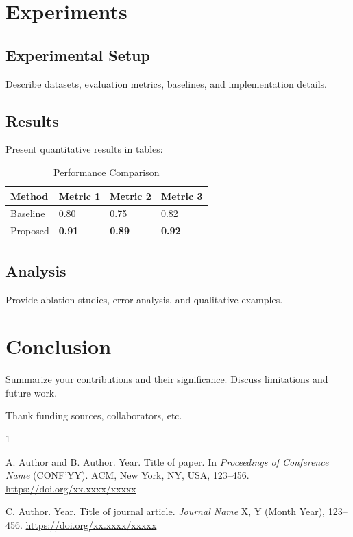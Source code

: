 \documentclass[sigconf]{acmart}
\begin{document}
\section{Experiments}
\label{sec:experiments}

\subsection{Experimental Setup}

Describe datasets, evaluation metrics, baselines, and implementation details.

\subsection{Results}

Present quantitative results in tables:

\begin{table}[htbp]
\caption{Performance Comparison}
\label{tab:results}
\centering
\begin{tabular}{@{}llll@{}}
\toprule
Method & Metric 1 & Metric 2 & Metric 3 \\
\midrule
Baseline & 0.80 & 0.75 & 0.82 \\
Proposed & \textbf{0.91} & \textbf{0.89} & \textbf{0.92} \\
\bottomrule
\end{tabular}
\end{table}

\subsection{Analysis}

Provide ablation studies, error analysis, and qualitative examples.

\section{Conclusion}
\label{sec:conclusion}

Summarize your contributions and their significance. Discuss limitations and 
future work.

\begin{acks}
Thank funding sources, collaborators, etc.
\end{acks}


% 

\begin{thebibliography}{1}

A. Author and B. Author. Year. Title of paper. In \emph{Proceedings of 
Conference Name} (CONF'YY). ACM, New York, NY, USA, 123--456. 
\url{https://doi.org/xx.xxxx/xxxxx}

C. Author. Year. Title of journal article. \emph{Journal Name} X, Y (Month 
Year), 123--456. \url{https://doi.org/xx.xxxx/xxxxx}

\end{thebibliography}
\end{document}
